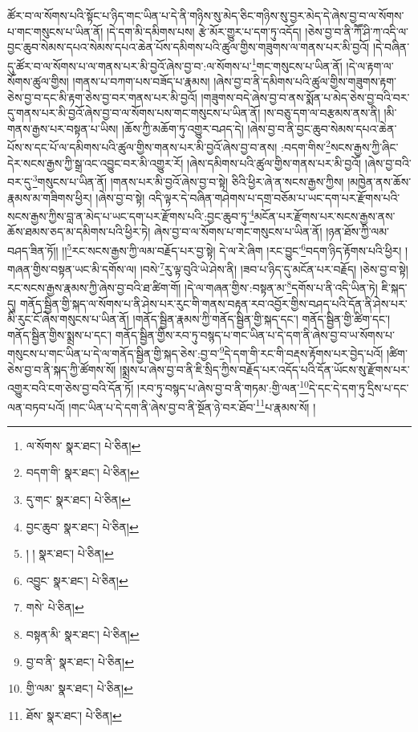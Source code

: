 ཚོར་བ་ལ་སོགས་པའི་སྟོང་པ་ཉིད་གང་ཡིན་པ་དེ་ནི་གཉིས་སུ་མེད་ཅིང་གཉིས་སུ་བྱར་མེད་དེ་ཞེས་བྱ་བ་ལ་སོགས་པ་གང་གསུངས་པ་ཡིན་ནོ། །དེ་དག་མི་དམིགས་པས། རྩེ་མོར་གྱུར་པ་དག་ཏུ་འདོད། །ཅེས་བྱ་བ་ནི་ཀཽ་ཤི་ཀ་འདི་ལ་བྱང་ཆུབ་སེམས་དཔའ་སེམས་དཔའ་ཆེན་པོས་དམིགས་པའི་ཚུལ་གྱིས་གཟུགས་ལ་གནས་པར་མི་བྱའོ། །དེ་བཞིན་དུ་ཚོར་བ་ལ་སོགས་པ་ལ་གནས་པར་མི་བྱའོ་ཞེས་བྱ་བ་:ལ་སོགས་པ་\footnote{ལ་སོགས་  སྣར་ཐང་།  པེ་ཅིན། }གང་གསུངས་པ་ཡིན་ནོ། །དེ་ལ་རྟག་ལ་སོགས་ཚུལ་གྱིས། །གནས་པ་བཀག་པས་བཟོད་པ་རྣམས། །ཞེས་བྱ་བ་ནི་དམིགས་པའི་ཚུལ་གྱིས་གཟུགས་རྟག་ཅེས་བྱ་བ་དང་མི་རྟག་ཅེས་བྱ་བར་གནས་པར་མི་བྱའོ། །གཟུགས་བདེ་ཞེས་བྱ་བ་ནས་སྨོན་པ་མེད་ཅེས་བྱ་བའི་བར་དུ་གནས་པར་མི་བྱའོ་ཞེས་བྱ་བ་ལ་སོགས་པས་གང་གསུངས་པ་ཡིན་ནོ། །ས་བཅུ་དག་ལ་བརྩམས་ནས་ནི། །མི་གནས་རྒྱས་པར་བསྟན་པ་ཡིས། །ཆོས་ཀྱི་མཆོག་ཏུ་འགྱུར་བཤད་དེ། །ཞེས་བྱ་བ་ནི་བྱང་ཆུབ་སེམས་དཔའ་ཆེན་པོས་ས་དང་པོ་ལ་དམིགས་པའི་ཚུལ་གྱིས་གནས་པར་མི་བྱའོ་ཞེས་བྱ་བ་ནས། :བདག་གིས་\footnote{བདག་གི་  སྣར་ཐང་།  པེ་ཅིན། }སངས་རྒྱས་ཀྱི་ཞིང་དེར་སངས་རྒྱས་ཀྱི་སྒྲ་འང་འབྱུང་བར་མི་འགྱུར་རོ། །ཞེས་དམིགས་པའི་ཚུལ་གྱིས་གནས་པར་མི་བྱའོ། །ཞེས་བྱ་བའི་བར་དུ་\footnote{དུ་གང་  སྣར་ཐང་།  པེ་ཅིན། }གསུངས་པ་ཡིན་ནོ། །གནས་པར་མི་བྱའོ་ཞེས་བྱ་བ་སྟེ། ཅིའི་ཕྱིར་ཞེ་ན་སངས་རྒྱས་ཀྱིས། །མཁྱེན་ནས་ཆོས་རྣམས་མ་གཟིགས་ཕྱིར། །ཞེས་བྱ་བ་སྟེ། འདི་ལྟར་དེ་བཞིན་གཤེགས་པ་དགྲ་བཅོམ་པ་ཡང་དག་པར་རྫོགས་པའི་སངས་རྒྱས་ཀྱིས་བླ་ན་མེད་པ་ཡང་དག་པར་རྫོགས་པའི་:བྱང་ཆུབ་ཏུ་\footnote{བྱང་ཆུབ་  སྣར་ཐང་།  པེ་ཅིན། }མངོན་པར་རྫོགས་པར་སངས་རྒྱས་ནས་ཆོས་ཐམས་ཅད་མ་དམིགས་པའི་ཕྱིར་ཏེ། ཞེས་བྱ་བ་ལ་སོགས་པ་གང་གསུངས་པ་ཡིན་ནོ། །ཉན་ཐོས་ཀྱི་ལམ་བཤད་ཟིན་ཏོ།། །།\footnote{། །  སྣར་ཐང་།  པེ་ཅིན། }རང་སངས་རྒྱས་ཀྱི་ལམ་བརྗོད་པར་བྱ་སྟེ། དེ་ལ་རེ་ཞིག །རང་བྱུང་\footnote{འབྱུང་  སྣར་ཐང་།  པེ་ཅིན། }བདག་ཉིད་རྟོགས་པའི་ཕྱིར། །གཞན་གྱིས་བསྟན་ཡང་མི་དགོས་ལ། །བསེ་\footnote{གསེ་  པེ་ཅིན། }རུ་ལྟ་བུའི་ཡེ་ཤེས་ནི། །ཟབ་པ་ཉིད་དུ་མངོན་པར་བརྗོད། །ཅེས་བྱ་བ་སྟེ། རང་སངས་རྒྱས་རྣམས་ཀྱི་ཞེས་བྱ་བའི་ཐ་ཚིག་གོ། །དེ་ལ་གཞན་གྱིས་:བསྟན་མ་\footnote{བསྟན་མི་  སྣར་ཐང་།  པེ་ཅིན། }དགོས་པ་ནི་འདི་ཡིན་ཏེ། ཇི་སྐད་དུ། གནོད་སྦྱིན་གྱི་སྐད་ལ་སོགས་པ་ནི་ཤེས་པར་རུང་གི་གནས་བརྟན་རབ་འབྱོར་གྱིས་བཤད་པའི་དོན་ནི་ཤེས་པར་མི་རུང་ངོ་ཞེས་གསུངས་པ་ཡིན་ནོ། །གནོད་སྦྱིན་རྣམས་ཀྱི་གནོད་སྦྱིན་གྱི་སྐད་དང་། གནོད་སྦྱིན་གྱི་ཚིག་དང་། གནོད་སྦྱིན་གྱིས་སྨྲས་པ་དང་། གནོད་སྦྱིན་གྱིས་རབ་ཏུ་བསྙད་པ་གང་ཡིན་པ་དེ་དག་ནི་ཞེས་བྱ་བ་ཡ་སོགས་པ་གསུངས་པ་གང་ཡིན་པ་དེ་ལ་གནོད་སྦྱིན་གྱི་སྐད་ཅེས་:བྱ་བ་\footnote{བྱ་བ་ནི་  སྣར་ཐང་།  པེ་ཅིན། }དེ་དག་གི་རང་གི་བརྡས་རྟོགས་པར་བྱེད་པའོ། །ཚིག་ཅེས་བྱ་བ་ནི་སྐད་ཀྱི་ཚོགས་སོ། །སྨྲས་པ་ཞེས་བྱ་བ་ནི་ཇི་སྲིད་ཀྱིས་བརྗོད་པར་འདོད་པའི་དོན་ཡོངས་སུ་རྫོགས་པར་འགྱུར་བའི་ངག་ཅེས་བྱ་བའི་དོན་ཏོ། །རབ་ཏུ་བསྙད་པ་ཞེས་བྱ་བ་ནི་གཏམ་:གྱི་ལན་\footnote{གྱི་ལམ་  སྣར་ཐང་།  པེ་ཅིན། }དེ་དང་དེ་དག་ཏུ་དྲིས་པ་དང་ལན་བཏབ་པའོ། །གང་ཡིན་པ་དེ་དག་ནི་ཞེས་བྱ་བ་ནི་སྔོན་ཉེ་བར་ཐོབ་\footnote{ཐོས་  སྣར་ཐང་།  པེ་ཅིན། }པ་རྣམས་སོ། །
